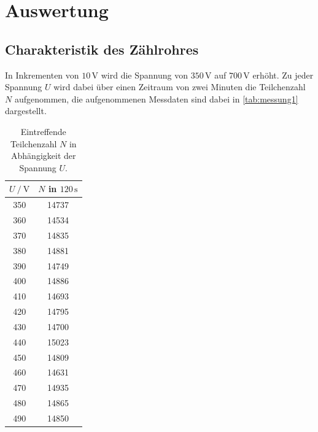 \section{Auswertung}
\label{sec:auswertung}

\subsection{Charakteristik des Zählrohres}
\label{subsec:charakteristik}

In Inkrementen von $10 \,\unit{\volt}$ wird die Spannung von $350 \,\unit{\volt}$ auf $700 \,\unit{\volt}$ erhöht.
Zu jeder Spannung $U$ wird dabei über einen Zeitraum von zwei Minuten die Teilchenzahl $N$ aufgenommen, die aufgenommenen Messdaten sind dabei in \autoref{tab:messung1} dargestellt.

\begin{table}[H]
    \centering
    \caption{Eintreffende Teilchenzahl $N$ in Abhängigkeit der Spannung $U$.}
    \label{tab:messung1}
    \begin{tabular}{S[table-format=3.0] S[table-format=5.0]}
      \toprule
        {$U \mathbin{/} \unit{\volt}$} & {$N$ in $120 \,\unit{\second}$} \\
               &           14737           \\
        360         &           14534           \\
        370         &           14835           \\
        380         &           14881           \\
        390         &           14749           \\
        400         &           14886           \\        
        410         &           14693           \\
        420         &           14795           \\
        430         &           14700           \\
        440         &           15023           \\
        450         &           14809           \\
        460         &           14631           \\
        470         &           14935           \\
        480         &           14865           \\
        490         &           14850           \\

\end{tabular}
\end{table}
